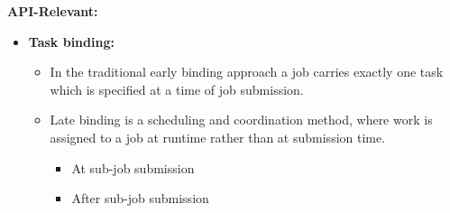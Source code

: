 \documentclass[]{article}
\begin{document}
\textbf{API-Relevant:}
\begin{itemize}
	\item \textbf{Task binding:~\cite{diane-thesis}} 
		\begin{itemize}
			\item In the traditional early binding approach a job carries
			 exactly one task which is specified at a time of job submission.
			\item Late binding is a scheduling and coordination
			 method, where work is assigned to a job at runtime rather than at
			 submission time.
			\begin{itemize}
				\item At sub-job submission 
				\item After sub-job submission
			\end{itemize}
		\end{itemize} 	


\end{itemize}
\end{document}
